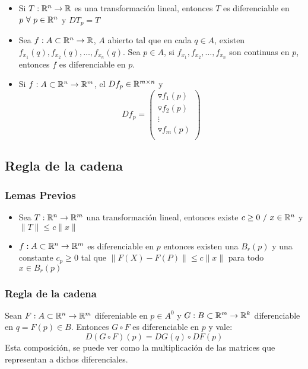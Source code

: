 \begin{itemize}[resume]
    \item Si $T:\mathbb{R}^n\to\mathbb{R}$ es una transformación lineal, entonces $T$ es diferenciable en $p~\forall~p\in\mathbb{R}^n$ y $DT_p = T$
    
    \item Sea $f:A\subset\mathbb{R}^n\to\mathbb{R}$, $A$ abierto tal que en cada $q\in A$, existen $f_{x_1}(q),f_{x_2}(q),\dots,f_{x_n}(q)$. Sea $p\in A$, si $f_{x_1},f_{x_2},\dots,f_{x_n}$ son continuas en $p$, entonces $f$ es diferenciable en $p$.
	
	\item Si $f:A\subset\mathbb{R}^n\to\mathbb{R}^m$, el $Df_p\in\mathbb{R}^{m\times n}$ y $$Df_p =\left(
	\begin{array}{c}
	    \triangledown f_1(p) \\
	    \triangledown f_2(p) \\
	    \vdots \\
	    \triangledown f_m(p) \\
	\end{array}
	\right)
	$$
	\end{itemize}
	
\subsection{Regla de la cadena}
\subsubsection{Lemas Previos}
\begin{itemize}
\item Sea $T:\mathbb{R}^n\to\mathbb{R}^m$ una transformación lineal, entonces existe $c\geq 0~/~x\in\mathbb{R}^n$ y $\|T\| \leq c\|x\|$

\item $f:A\subset\mathbb{R}^n\to\mathbb{R}^m$ es diferenciable en $p$ entonces existen una $B_r(p)$ y una constante $c_p\geq 0$ tal que $\|F(X)-F(P)\| \leq c\|x\|$ para todo $x\in B_r(p)$
\end{itemize}
\subsubsection{Regla de la cadena}
Sean $F: A\subset\mathbb{R}^n\to\mathbb{R}^m$ difereniable en $p\in A^0$ y $G: B\subset\mathbb{R}^m\to\mathbb{R}^k$ diferenciable en $q=F(p)\in B$. Entonces $G\circ F$ es diferenciable en $p$ y vale: $$D(G\circ F)(p) = DG(q) \circ DF(p)$$
Esta composición, se puede ver como la multiplicación de las matrices que representan a dichos diferenciales.

